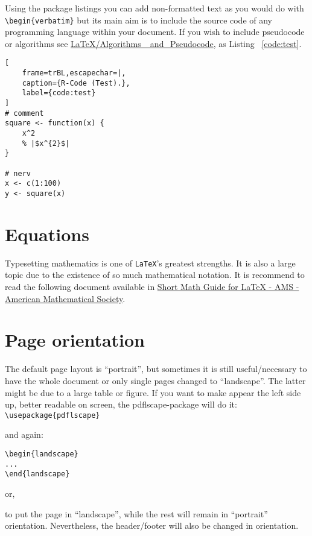 Using the package listings you can add non-formatted text as you would do with \verb!\begin{verbatim}! but its main aim is to include the source code of any programming language within your document. If you wish to include pseudocode or algorithms see \href{http://en.wikibooks.org/wiki/LaTeX/Algorithms_and_Pseudocode}{LaTeX/Algorithms\_ and\_Pseudocode}, as Listing ~\ref{code:test}.

\begin{minipage}{\textwidth}
\lstset{language=R,numbers=left}
\begin{lstlisting}[
    frame=trBL,escapechar=|,
    caption={R-Code (Test).},
    label={code:test}
]
# comment
square <- function(x) {
    x^2
    % |$x^{2}$|
}

# nerv
x <- c(1:100)
y <- square(x)
\end{lstlisting}
\end{minipage}

\section{Equations}

Typesetting mathematics is one of \texttt{LaTeX}'s greatest strengths. It is also a large topic due to the existence of so much mathematical notation. It is recommend to read the following document available in \href{http://www.google.pt/url?sa=t&rct=j&q=&esrc=s&source=web&cd=1&cad=rja&ved=0CB4QFjAA&url=ftp%3A%2F%2Fftp.ams.org%2Fpub%2Ftex%2Fdoc%2Famsmath%2Fshort-math-guide.pdf&ei=DkScUOm8IJC5hAei7oGQDg&usg=AFQjCNEHl1pXuurNmXAdqfC0z-pPAbDyUw}{Short Math Guide for LaTeX - AMS - American Mathematical Society}.

\section{Page orientation}

\begin{sloppypar}
The default page layout is ``portrait'', but sometimes it is still useful/necessary to have the whole document or only single pages changed to ``landscape''. The latter might be due to a large table or figure. If you want to make appear the left side up, better readable on screen, the pdflscape-package will do it:
\verb!\usepackage{pdflscape}!
\end{sloppypar}
and again:
\begin{verbatim}
\begin{landscape}
...
\end{landscape}
\end{verbatim}

or, 
\verb!!

to put the page in ``landscape'', while the rest will remain in ``portrait'' orientation. Nevertheless, the header/footer will also be changed in orientation.

